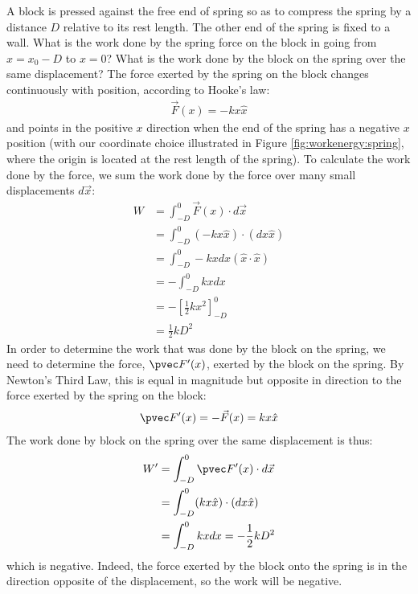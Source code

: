 \begin{example}{ A block is pressed against the free end of spring so as to compress the spring by a distance $D$ relative to its rest length. The other end of the spring is fixed to a wall. What is the work done by the spring force on the block in going from $x=x_0-D$ to $x=0$? What is the work done by the block on the spring over the same displacement?}
The force exerted by the spring on the block changes continuously with position, according to Hooke's law:
\begin{align*}
\vec F(x) = -kx \hat x
\end{align*}
and points in the positive $x$ direction when the end of the spring has a negative $x$ position (with our coordinate choice illustrated in Figure \ref{fig:workenergy:spring}, where the origin is located at the rest length of the spring). To calculate the work done by the force, we sum the work done by the force over many small displacements $d\vec x$:
\begin{align*}
W &= \int_{-D}^0 \vec F(x) \cdot d\vec x\\
&=\int_{-D}^0 (-kx \hat x) \cdot (dx \hat x)\\
&=\int_{-D}^0 -kxdx (\hat x \cdot \hat x)\\
&=-\int_{-D}^0 kx dx\\
&=-\left[\frac{1}{2}kx^2  \right]_{-D}^0\\
&=\frac{1}{2}kD^2
\end{align*}
In order to determine the work that was done by the block on the spring, we need to determine the force, $\pvec F'(x)$, exerted by the block on the spring. By Newton's Third Law, this is equal in magnitude but opposite in direction to the force exerted by the spring on the block:
\begin{align*}
\pvec F'(x) = -\vec F(x) = kx \hat x
\end{align*}
The work done by block on the spring over the same displacement is thus:
\begin{align*}
W' &= \int_{-D}^0 \pvec F'(x) \cdot d\vec x\\
&=\int_{-D}^0 (kx \hat x) \cdot (dx \hat x)\\
&=\int_{-D}^0 kx dx=-\frac{1}{2}kD^2\\
\end{align*}
which is negative. Indeed, the force exerted by the block onto the spring is in the direction opposite of the displacement, so the work will be negative. 
\end{example}

